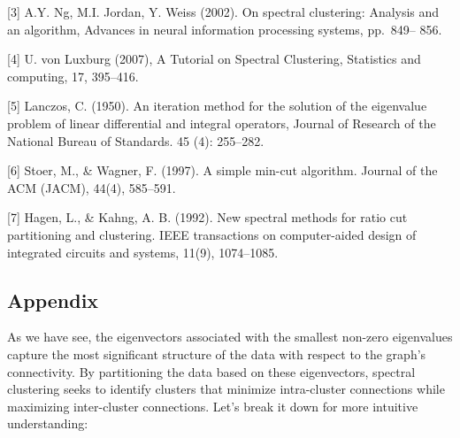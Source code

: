 \documentclass[11pt]{article}
\begin{document}
{[}3{]} A.Y. Ng, M.I. Jordan, Y. Weiss (2002). On spectral clustering:
Analysis and an algorithm, Advances in neural information processing
systems, pp.~849-- 856.

{[}4{]} U. von Luxburg (2007), A Tutorial on Spectral Clustering,
Statistics and computing, 17, 395--416.

{[}5{]} Lanczos, C. (1950). An iteration method for the solution of the
eigenvalue problem of linear differential and integral operators,
Journal of Research of the National Bureau of Standards. 45 (4):
255--282.

{[}6{]} Stoer, M., \& Wagner, F. (1997). A simple min-cut algorithm.
Journal of the ACM (JACM), 44(4), 585--591.

{[}7{]} Hagen, L., \& Kahng, A. B. (1992). New spectral methods for
ratio cut partitioning and clustering. IEEE transactions on
computer-aided design of integrated circuits and systems, 11(9),
1074--1085.
\newpage
    \subsection{Appendix}\label{appendix}

    As we have see, the eigenvectors associated with the smallest non-zero
eigenvalues capture the most significant structure of the data with
respect to the graph's connectivity. By partitioning the data based on
these eigenvectors, spectral clustering seeks to identify clusters that
minimize intra-cluster connections while maximizing inter-cluster
connections. Let's break it down for more intuitive understanding:
\end{document}
